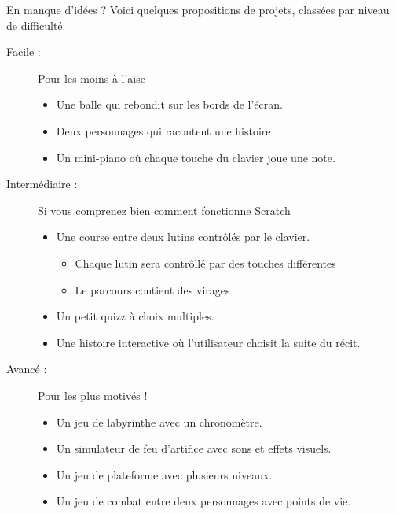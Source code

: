 \begin{UPSTIinfor}{En manque d'idées ?}
    Voici quelques propositions de projets, classées par niveau de difficulté. 
    
    \begin{description}
        \item[Facile :]  Pour les moins à l'aise 
        \begin{itemize}
            \item Une balle qui rebondit sur les bords de l’écran.  
            \item Deux personnages qui racontent une histoire
            \item Un mini-piano où chaque touche du clavier joue une note.  
        \end{itemize}

        \item[Intermédiaire :] Si vous comprenez bien comment fonctionne Scratch
        \begin{itemize}
            \item Une course entre deux lutins contrôlés par le clavier. 
            \begin{itemize}
                \item Chaque lutin sera contrôllé par des touches différentes
                \item Le parcours contient des virages
            \end{itemize} 
            \item Un petit quizz à choix multiples.  
            \item Une histoire interactive où l’utilisateur choisit la suite du récit.  
        \end{itemize}

        \item[Avancé :]  Pour les plus motivés !
        \begin{itemize}
            \item Un jeu de labyrinthe avec un chronomètre.  
            \item Un simulateur de feu d’artifice avec sons et effets visuels.  
            \item Un jeu de plateforme avec plusieurs niveaux.  
            \item Un jeu de combat entre deux personnages avec points de vie.  
        \end{itemize}
    \end{description}
\end{UPSTIinfor}